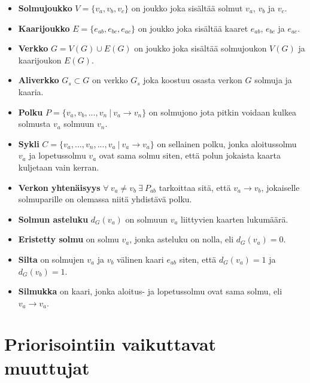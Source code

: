   \begin{itemize}
    \item \textbf{Solmujoukko} \(V = \{v_a, v_b, v_c\}\) on joukko joka sisältää solmut \(v_a\), \(v_b\) ja \(v_c\).
    \item \textbf{Kaarijoukko} \(E = \{e_{ab}, e_{bc}, e_{ac}\}\) on joukko joka sisältää kaaret \(e_{ab}\), \(e_{bc}\) ja \(e_{ac}\).
    \item \textbf{Verkko} \(G = V(G) \cup E(G)\) on joukko joka sisältää solmujoukon \(V(G)\) ja kaarijoukon \(E(G)\).
    \item \textbf{Aliverkko} \(G_s \subset G\) on verkko \(G_s\) joka koostuu osasta verkon \(G\) solmuja ja kaaria.
    \item \textbf{Polku} \(P = \{v_a, v_b, ..., v_n \: | \: v_a \rightarrow v_n\}\) on solmujono jota pitkin voidaan kulkea solmusta \(v_a\) solmuun \(v_n\).
    \item \textbf{Sykli} \(C = \{v_a, ..., v_n,..., v_a \: | \: v_a \rightarrow v_a\}\) on sellainen polku, jonka aloitussolmu \(v_a\) ja lopetussolmu \(v_a\) ovat sama solmu siten, että polun jokaista kaarta kuljetaan vain kerran.
    \item \textbf{Verkon yhtenäisyys} \(\forall \: v_a \neq v_b \: \exists \: P_{ab}\) tarkoittaa sitä, että \(v_a \rightarrow v_b\), jokaiselle solmuparille on olemassa niitä yhdistävä polku.
    \item \textbf{Solmun asteluku} \(d_G(v_a)\) on solmuun \(v_a\) liittyvien kaarten lukumäärä.
    \item \textbf{Eristetty solmu} on solmu \(v_a\), jonka asteluku on nolla, eli \(d_G(v_a) = 0\).
    \item \textbf{Silta} on solmujen \(v_a\) ja \(v_b\) välinen kaari \(e_{ab}\) siten, että \(d_G(v_a) = 1\) ja \(d_G(v_b) = 1\).
    \item \textbf{Silmukka} on kaari, jonka aloitus- ja lopetussolmu  ovat sama solmu, eli \(v_a \rightarrow v_a\).
  \end{itemize}

\section{Priorisointiin vaikuttavat muuttujat} \label{ch:10_priorisointiin_vaikuttavat_muuttujat}

